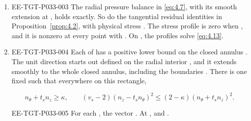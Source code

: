 \begin{theorem}
\begin{enumerate}[label=(\roman*)]
\item
\begin{EESegment}{EE-TGT-P033-003}
The radial pressure balance
 in \eqref{eq:4.7}, with its smooth extension
 at , holds exactly.
So do the tangential residual identities in Proposition~\ref{prop:4.2}, with
physical stress . The stress
profile  is zero when
, and it is nonzero
at every point with . On
, the profiles solve \eqref{eq:4.13}.
\end{EESegment}

\item
\begin{EESegment}{EE-TGT-P033-004}
Each of  has a positive lower bound on the
closed annulus . The unit
direction  starts out
defined on the radial interior
, and it extends smoothly to the
whole closed annulus, including the boundaries
. There is one fixed
 such that everywhere on this rectangle,
\end{EESegment}
\begin{equation}
  n_\theta+t_sn_z\geq\kappa,\qquad
  (v_s-2)(n_z-t_sn_\theta)^2\leq(2-\kappa)(n_\theta+t_sn_z)^2.
  \tag{4.26}\label{eq:4.26}
\end{equation}
\begin{EESegment}{EE-TGT-P033-005}
For each , the vector
.
At ,
 and
.
\end{EESegment}


\end{enumerate}
\end{theorem}
